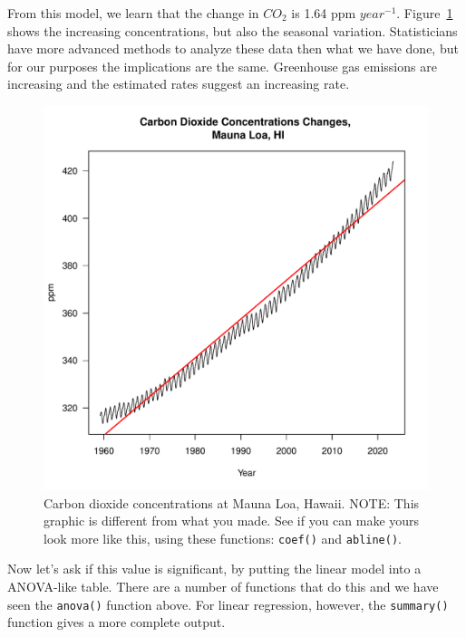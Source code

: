 \documentclass{tufte-handout}\usepackage[]{graphicx}\usepackage[]{xcolor}
\makeatletter
\def\maxwidth{ %
  \ifdim\Gin@nat@width>\linewidth
    \linewidth
  \else
    \Gin@nat@width
  \fi
}
\newenvironment{knitrout}{}{} %
\makeatother
\begin{document}
From this model, we learn that the change in $CO_2$ is 1.64 ppm $year^{-1}$. Figure~\ref{fig:maunaloa} shows the increasing concentrations, but also the seasonal variation. Statisticians have more advanced methods to analyze these data then what we have done, but for our purposes the implications are the same.  Greenhouse gas emissions are increasing and the estimated rates suggest an increasing rate.

\begin{figure}
\label{fig:maunaloa}
\caption{Carbon dioxide concentrations at Mauna Loa, Hawaii. NOTE: This graphic is different from what you made. See if you can make yours look more like this, using these functions: \texttt{coef()} and \texttt{abline()}.}
\begin{knitrout}
\color{fgcolor}
\includegraphics[width=\maxwidth]{figure/unnamed-chunk-54-1} 
\end{knitrout}
\end{figure}

Now let's ask if this value is significant, by putting the linear model into a ANOVA-like table. There are a number of functions that do this and we have seen the \texttt{anova()} function above. For linear regression, however, the \texttt{summary()} function gives a more complete output.
\end{document}
